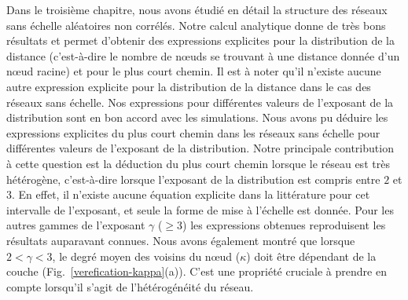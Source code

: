 Dans le troisième chapitre, nous avons étudié en détail la structure  des réseaux sans échelle aléatoires non corrélés. Notre calcul analytique donne de très bons résultats et permet d'obtenir des expressions explicites pour la distribution de la distance (c'est-à-dire le nombre de nœuds se trouvant à une distance donnée d'un nœud racine) et pour le plus court chemin. Il est à noter qu'il n’existe aucune autre expression explicite pour la distribution de la distance dans le cas des réseaux sans échelle. Nos expressions pour différentes valeurs de l'exposant de la distribution sont en bon accord avec les simulations. Nous avons pu déduire les expressions explicites du plus court chemin dans les réseaux sans échelle pour différentes valeurs de l'exposant de la distribution. Notre principale contribution à cette question est la déduction du plus court chemin lorsque le réseau est très hétérogène, c'est-à-dire  lorsque l'exposant de la distribution est compris entre $2$ et $3$. En effet, il n’existe aucune équation explicite dans la littérature pour cet intervalle de l'exposant, et seule la forme de mise à l'échelle est donnée. Pour les autres gammes de l'exposant $\gamma$ ($\geq 3$) les expressions obtenues reproduisent les résultats auparavant connues. 
Nous avons également montré que lorsque $2 <\gamma <3$, le degré moyen des voisins du nœud ($\kappa$) doit être dépendant de la couche (Fig.~\ref{verefication-kappa}(a)). C’est une propriété cruciale à prendre en compte lorsqu’il s’agit de l’hétérogénéité du réseau.


